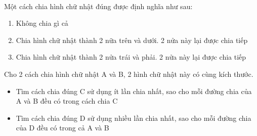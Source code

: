  

Một cách chia hình chữ nhật đúng được định nghĩa như sau:
\begin{enumerate}
	\item Không chia gì cả
	\item Chia hình chữ nhật thành 2 nữa trên và dưới. 2 nửa này lại được chia tiếp
	\item Chia hình chữ nhật thành 2 nửa trái và phải. 2 nửa này lại được chia tiếp
\end{enumerate}

Cho 2 cách chia hình chữ nhật A và B, 2 hình chữ nhật này có cùng kích thước.
\begin{itemize}
	\item Tìm cách chia đúng C sử dụng ít lần chia nhất, sao cho mỗi đường chia của A và B đều có trong cách chia C
	\item Tìm cách chia đúng D sử dụng nhiều lần chia nhất, sao cho mỗi đường chia của D đều có trong cả A và B
\end{itemize}

\